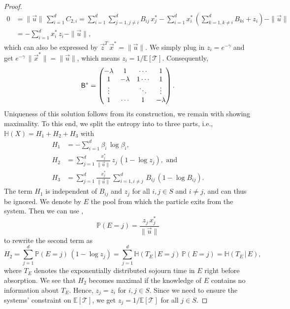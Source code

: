 \documentclass[smallextended]{svjour3}
\renewcommand{\P}{\mathbb{P}}
\newcommand{\E}{\mathbb{E}}
\newcommand{\TT}{\mathcal{T}}
\renewcommand{\H}{\mathbb{H}}
\newcommand{\suml}{\sum\limits}
\newcommand{\vnorms}[1]{\|#1\|}
\newcommand{\ie}{i.e.}
\begin{document}
\begin{proof}
		\begin{equation*}
		\begin{aligned}
			0 &= \vnorms{\vec{u}}\,\suml_{i=1}^d C_{2,i} = \suml_{i=1}^d \suml_{j=1,j\neq i}^d B_{ij}\,x_j^\ast - \suml_{i=1}^d x_i^\ast\,\left(\suml_{k=1,k\neq i}^d B_{ki}+z_i\right) - \vnorms{\vec{u}}\\
			&= -\suml_{i=1}^d x_i^\ast\,z_i - \vnorms{\vec{u}},		
		\end{aligned}
		\end{equation*}
		which can also be expressed by $\vec{z}^T\,\vec{x}^\ast = \vnorms{\vec{u}}$.
		We simply plug in $z_i=e^{-\gamma}$ and get $e^{-\gamma}\,\vnorms{\vec{x}^\ast} = \|\vec{u}\|$, which means $z_i = 1/\E\left[\TT\right]$.
		Consequently,
		\begin{equation*}
			\mathsf{B}^\ast = \begin{pmatrix}
									-\lambda & 1 & \cdots & 1\\
									1 & -\lambda & 1 \cdots & 1 \\
									\vdots & & \ddots & \vdots\\
									1 & \cdots & 1 & -\lambda
							\end{pmatrix}.
		\end{equation*}
		Uniqueness of this solution follows from its construction, we remain with showing maximality.
		To this end, we split the entropy into to three parts, \ie, $\H(X) = H_1 + H_2 + H_3$ with
		\begin{equation*}
			\begin{aligned}
				H_1 &= -\suml_{i=1}^d\beta_i\,\log\beta_i,\\
				H_2 &= \suml_{j=1}^d \frac{x^\ast_j}{\vnorms{\vec{u}}}\,z_j\,(1-\log z_j), \text{ and}\\
				H_3 &= \suml_{j=1}^d \frac{x^\ast_j}{\vnorms{\vec{u}}}\,\suml_{i=1,i\neq j}^d \,B_{ij}\,(1-\log B_{ij}).
			\end{aligned}
		\end{equation*}
		The term $H_1$ is independent of $B_{ij}$ and $z_j$ for all $i,j\in S$ and $i\neq j$, and can thus be ignored.
		We denote by $E$ the pool from which the particle exits from the system.
		Then we can use \citep[Section 5.3]{Metzler2018MGS},
		\begin{equation*}
		  \P(E=j) = \frac{z_j\,x^\ast_j}{\vnorms{\vec{u}}}
		\end{equation*}
    to rewrite the second term as
		\begin{equation*}
			H_2 = \suml_{j=1}^d \P(E=j)\,(1-\log z_j) = \suml_{j=1}^d \H(T_E\,|\,E=j)\,\P(E=j) = \H(T_E\,|\,E),
		\end{equation*}
		where $T_E$ denotes the exponentially distributed sojourn time in $E$ right before absorption.
		We see that $H_2$ becomes maximal if the knowledge of $E$ contains no information about $T_E$.
		Hence, $z_j=z_i$ for $i,j\in S$.
		Since we need to ensure the systems' constraint on $\E\left[\TT\right]$, we get $z_j=1/\E\left[\TT\right]$ for all $j\in S$.
		

\end{proof}
\end{document}
